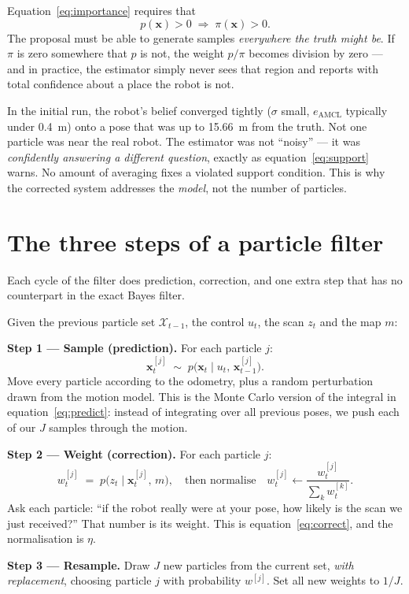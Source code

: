 \documentclass[11pt,a4paper]{report}
\newcommand{\xt}{\mathbf{x}}
\begin{document}
Equation~\eqref{eq:importance} requires that
\begin{equation}
p(\xt) > 0 \;\Longrightarrow\; \pi(\xt) > 0 .
\label{eq:support}
\end{equation}
The proposal must be able to generate samples \emph{everywhere the truth might
be}. If $\pi$ is zero somewhere that $p$ is not, the weight
$p/\pi$ becomes division by zero --- and in practice, the estimator simply
never sees that region and reports with total confidence about a place the
robot is not.

\begin{warnbox}
In the initial run, the robot's belief converged tightly ($\sigma$ small,
$e_{\text{AMCL}}$ typically under \SI{0.4}{\metre}) onto a pose that was up to
\SI{15.66}{\metre} from the truth. Not one particle was near the real robot.
The estimator was not ``noisy'' --- it was \emph{confidently answering a
different question}, exactly as equation~\eqref{eq:support} warns. No amount of
averaging fixes a violated support condition. This is why the corrected system
addresses the \emph{model}, not the number of particles.
\end{warnbox}

\section{The three steps of a particle filter}

Each cycle of the filter does prediction, correction, and one extra step
that has no counterpart in the exact Bayes filter.

\begin{plain}
Given the previous particle set $\mathcal{X}_{t-1}$, the control $u_t$, the
scan $z_t$ and the map $m$:

\smallskip
\textbf{Step 1 --- Sample (prediction).} For each particle $j$:
\[
\xt_t^{[j]} \;\sim\; p\bigl(\xt_t \mid u_t,\, \xt_{t-1}^{[j]}\bigr).
\]
Move every particle according to the odometry, plus a random perturbation
drawn from the motion model. This is the Monte Carlo version of the integral
in equation~\eqref{eq:predict}: instead of integrating over all previous
poses, we push each of our $J$ samples through the motion.

\smallskip
\textbf{Step 2 --- Weight (correction).} For each particle $j$:
\[
w_t^{[j]} \;=\; p\bigl(z_t \mid \xt_t^{[j]},\, m\bigr),
\quad\text{then normalise}\quad
w_t^{[j]} \leftarrow \frac{w_t^{[j]}}{\sum_{k} w_t^{[k]}} .
\]
Ask each particle: ``if the robot really were at your pose, how likely is the
scan we just received?'' That number is its weight. This is
equation~\eqref{eq:correct}, and the normalisation is $\eta$.

\smallskip
\textbf{Step 3 --- Resample.} Draw $J$ new particles from the current set,
\emph{with replacement}, choosing particle $j$ with probability $w^{[j]}$.
Set all new weights to $1/J$.
\end{plain}
\end{document}

